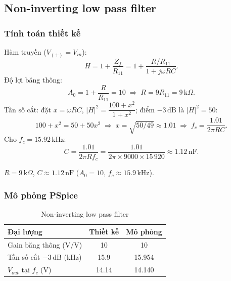 \subsection{Non-inverting low pass filter \bonus}\label{sec:lpf-b}

\subsubsection*{Tính toán thiết kế}
Hàm truyền ($V_{(+)} = V_{in}$):
\[
H = 1 + \frac{Z_f}{R_{11}} = 1 + \frac{R/R_{11}}{1 + j\omega RC}.
\]
Độ lợi băng thông:
\[
A_0 = 1 + \frac{R}{R_{11}} = 10 \;\Rightarrow\; R = 9R_{11} = 9\,\text{k}\Omega.
\]
Tần số cắt: đặt $x = \omega RC$, $|H|^2 = \dfrac{100 + x^2}{1 + x^2}$; điểm $-3\,\text{dB}$ là $|H|^2 = 50$:
\[
100 + x^2 = 50 + 50x^2 \;\Rightarrow\; x = \sqrt{50/49} \approx 1.01
\;\Rightarrow\; f_c = \frac{1.01}{2\pi RC}.
\]
Cho $f_c = 15.92\,\text{kHz}$:
\[
C = \frac{1.01}{2\pi R f_c} = \frac{1.01}{2\pi \times 9000 \times 15\,920} \approx 1.12\,\text{nF}.
\]

\begin{dapsobox}
$R = 9\,\text{k}\Omega$, \quad $C \approx 1.12\,\text{nF}$ \quad ($A_0 = 10$, $f_c \approx 15.9\,\text{kHz}$).
\end{dapsobox}

\subsubsection*{Mô phỏng PSpice}
\simresult
{}
\begin{table}[H]
\centering
\begin{tabular}{l c c}
\toprule
\textbf{Đại lượng} & \textbf{Thiết kế} & \textbf{Mô phỏng}\\
\midrule
Gain băng thông (V/V)            & 10    & 10\\
Tần số cắt $-3\,\text{dB}$ (kHz) & 15.9  & 15.954\\
$V_{out}$ tại $f_c$ (V)          & 14.14 & 14.140\\
\bottomrule
\end{tabular}
\caption{Non-inverting low pass filter}
\end{table}
